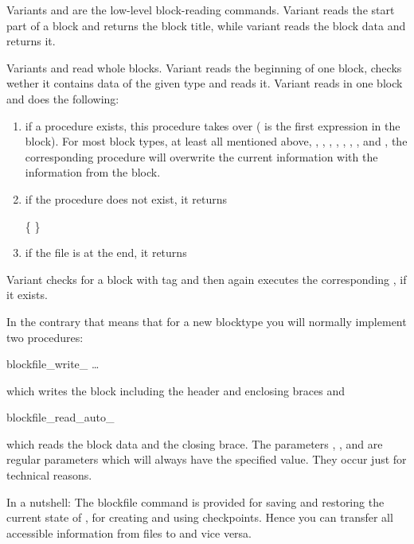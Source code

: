 Variants  and  are the low-level block-reading
commands. Variant  reads the start part of a block and
returns the block title, while variant  reads the block
data and returns it.

Variants  and  read whole blocks.  Variant
 reads the beginning of one block, checks wether it
contains data of the given type and reads it. Variant 
reads in one block and does the following:
\begin{enumerate}
\item if a procedure  exists,
  this procedure takes over ( is the first expression in the
  block). For most block types, at least all mentioned above, \ie
  , , ,
  , , ,
  , and , the corresponding
  procedure will overwrite the current information with the
  information from the block.
\item if the procedure does not exist, it returns 
  \begin{code}
    \{   \}
  \end{code}
\item if the file is at the end, it returns 
\end{enumerate}

Variant  checks for a block with tag  and then
again executes the corresponding ,
if it exists.

In the contrary that means that for a new blocktype you will normally
implement two procedures:
\begin{essyntaxbox}
  blockfile_write_    \dots
\end{essyntaxbox}
which writes the block including the header and enclosing braces and
\begin{essyntaxbox}
  blockfile_read_auto_   
\end{essyntaxbox}
which reads the block data and the closing brace. The parameters
, ,  and  are regular
parameters which will always have the specified value. They occur just
for technical reasons.

In a nutshell: The blockfile command is provided for saving and
restoring the current state of \es, \eg for creating and using
checkpoints. Hence you can transfer all accessible information from
files to \es and vice versa.

